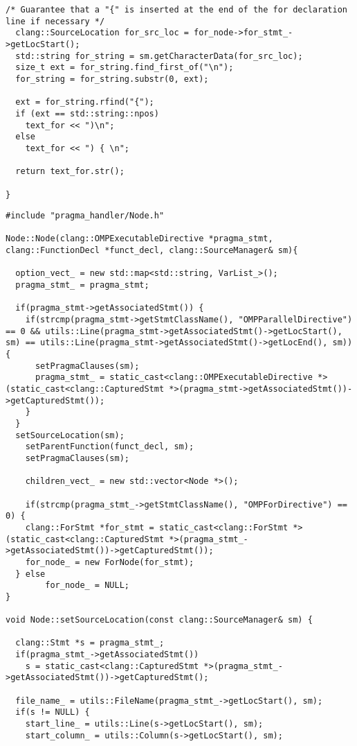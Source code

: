 \documentclass[a4paper,10pt,twoside]{book}
\begin{document}
\begin{lstlisting}[language=CCC, caption=driver/program.cpp]
  /* Guarantee that a "{" is inserted at the end of the for declaration line if necessary */ 
  clang::SourceLocation for_src_loc = for_node->for_stmt_->getLocStart();
  std::string for_string = sm.getCharacterData(for_src_loc);
  size_t ext = for_string.find_first_of("\n");
  for_string = for_string.substr(0, ext);

  ext = for_string.rfind("{");
  if (ext == std::string::npos)
    text_for << ")\n";
  else
    text_for << ") { \n";

  return text_for.str();

}
\end{lstlisting}

\begin{lstlisting}[language=CCC, caption=pragma\_handler/Node.cpp]
#include "pragma_handler/Node.h"

Node::Node(clang::OMPExecutableDirective *pragma_stmt, clang::FunctionDecl *funct_decl, clang::SourceManager& sm){
  
  option_vect_ = new std::map<std::string, VarList_>();
  pragma_stmt_ = pragma_stmt;

  if(pragma_stmt->getAssociatedStmt()) {
    if(strcmp(pragma_stmt->getStmtClassName(), "OMPParallelDirective") == 0 && utils::Line(pragma_stmt->getAssociatedStmt()->getLocStart(), sm) == utils::Line(pragma_stmt->getAssociatedStmt()->getLocEnd(), sm)){
      setPragmaClauses(sm);
      pragma_stmt_ = static_cast<clang::OMPExecutableDirective *>(static_cast<clang::CapturedStmt *>(pragma_stmt->getAssociatedStmt())->getCapturedStmt());
    }
  }
  setSourceLocation(sm);
	setParentFunction(funct_decl, sm);	
	setPragmaClauses(sm);

	children_vect_ = new std::vector<Node *>();

	if(strcmp(pragma_stmt_->getStmtClassName(), "OMPForDirective") == 0) {
    clang::ForStmt *for_stmt = static_cast<clang::ForStmt *>(static_cast<clang::CapturedStmt *>(pragma_stmt_->getAssociatedStmt())->getCapturedStmt());
    for_node_ = new ForNode(for_stmt);
  } else
		for_node_ = NULL;
}

void Node::setSourceLocation(const clang::SourceManager& sm) {
  
  clang::Stmt *s = pragma_stmt_;
  if(pragma_stmt_->getAssociatedStmt())
    s = static_cast<clang::CapturedStmt *>(pragma_stmt_->getAssociatedStmt())->getCapturedStmt();

  file_name_ = utils::FileName(pragma_stmt_->getLocStart(), sm);
  if(s != NULL) {
    start_line_ = utils::Line(s->getLocStart(), sm);
    start_column_ = utils::Column(s->getLocStart(), sm);


\end{lstlisting}
\end{document}
